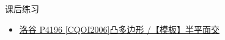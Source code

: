 \begin{frame}[fragile]{课后练习}
	\begin{itemize}
		\item \href{https://www.luogu.com.cn/problem/P4196}{洛谷 P4196 [CQOI2006]凸多边形 /【模板】半平面交}
	\end{itemize}
\end{frame}
